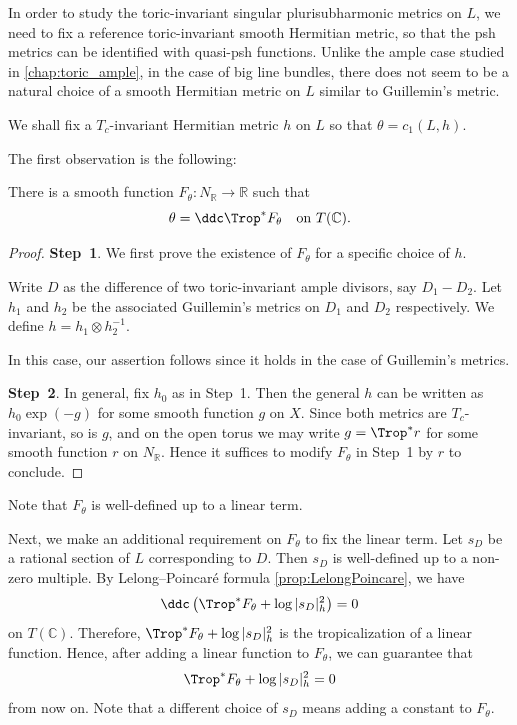 In order to study the toric-invariant singular plurisubharmonic metrics on $L$, we need to fix a reference toric-invariant smooth Hermitian metric, so that the psh metrics can be identified with quasi-psh functions.
Unlike the ample case studied in \cref{chap:toric_ample}, in the case of big line bundles, there does not seem to be a natural choice of a smooth Hermitian metric on $L$ similar to Guillemin's metric.


We shall fix a $T_c$-invariant Hermitian metric $h$ on $L$ so that $\theta=c_1(L,h)$.

The first observation is the following:
\begin{lemma}\label{lma:exist_Ftheta}
    There is a smooth function $F_{\theta}\colon N_{\mathbb{R}}\rightarrow \mathbb{R}$ such that
    \[
        \theta=\ddc \Trop^*F_{\theta}\quad\textup{on }T(\mathbb{C}).
    \]
\end{lemma}
\begin{proof}
    \textbf{Step~1}. We first prove the existence of $F_{\theta}$ for a specific choice of $h$.

    Write $D$ as the difference of two toric-invariant ample divisors, say $D_1-D_2$. Let $h_1$ and $h_2$ be the associated Guillemin's metrics on $D_1$ and $D_2$ respectively. We define $h=h_1\otimes h_2^{-1}$.

    In this case, our assertion follows since it holds in the case of Guillemin's metrics.

    \textbf{Step~2}. In general, fix $h_0$ as in Step~1. Then the general $h$ can be written as $h_0\exp(-g)$ for some smooth function $g$ on $X$. Since both metrics are $T_c$-invariant, so is $g$, and on the open torus we may write $g=\Trop^* r$ for some smooth function $r$ on $N_{\mathbb{R}}$.
    Hence it suffices to modify $F_{\theta}$ in Step~1 by $r$ to conclude.
\end{proof}
Note that $F_{\theta}$ is well-defined up to a linear term.

Next, we make an additional requirement on $F_{\theta}$ to fix the linear term. Let $s_D$ be a rational section of $L$ corresponding to $D$. Then $s_D$ is well-defined up to a non-zero multiple. By Lelong--Poincaré formula \cref{prop:LelongPoincare}, we have
\[
\ddc\left( \Trop^*F_{\theta}+\log |s_D|_h^2 \right)=0
\]
on $T(\mathbb{C})$. Therefore, $\Trop^*F_{\theta}+\log |s_D|_h^2$ is the tropicalization of a linear function. Hence, after adding a linear function to $F_{\theta}$, we can guarantee that
\begin{equation}\label{eq:normF0}
\Trop^*F_{\theta}+\log |s_D|_h^2=0
\end{equation}
from now on. Note that a different choice of $s_D$ means adding a constant to $F_{\theta}$.

